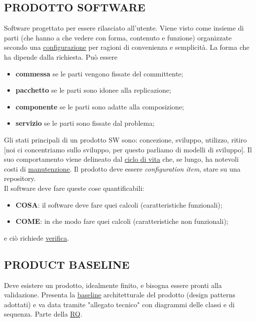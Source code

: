 		\subsection{PRODOTTO SOFTWARE}  \label{prodotto}
		Software progettato per essere rilasciato all'utente. Viene visto come insieme di parti (che hanno a che vedere con forma, contenuto e funzione) organizzate secondo una \underline{\hyperref[configurazione]{configurazione}} per ragioni di convenienza e semplicità. La forma che ha dipende dalla richiesta. Può essere
			\begin{itemize}
				\item \textbf{commessa} se le parti vengono fissate del committente;
				\item \textbf{pacchetto} se le parti sono idonee alla replicazione;
				\item \textbf{componente} se le parti sono adatte alla composizione;
				\item \textbf{servizio} se le parti sono fissate dal problema;
			\end{itemize}
		Gli stati principali di un prodotto SW sono: concezione, sviluppo, utilizzo, ritiro [noi ci concentriamo sullo sviluppo, per questo parliamo di modelli di sviluppo].
		Il suo comportamento viene delineato dal \underline{\hyperref[ciclo]{ciclo di vita}} che, se lungo, ha notevoli costi di \underline{\hyperref[manutenzione]{manutenzione}}. 
		Il prodotto deve essere \textit{configuration item}, stare su una repository. \\
		Il software deve fare queste cose quantificabili:
		\begin{itemize}
			\item \textbf{COSA}: il software deve fare quei calcoli (caratteristiche funzionali);
			\item \textbf{COME}: in che modo fare quei calcoli (caratteristiche non funzionali);
		\end{itemize}
		e ciò richiede \underline{\hyperref[verificare]{verifica}}.
		

		\subsection{PRODUCT BASELINE}	 \label{productbaseline}
		Deve esistere un prodotto, idealmente finito, e bisogna essere pronti alla validazione. Presenta la \underline{\hyperref[baseline]{baseline}} architetturale del prodotto (design patterns adottati) e va data tramite "allegato tecnico" con diagrammi delle classi e di sequenza. Parte della \underline{\hyperref[RQ]{RQ}}.
		

